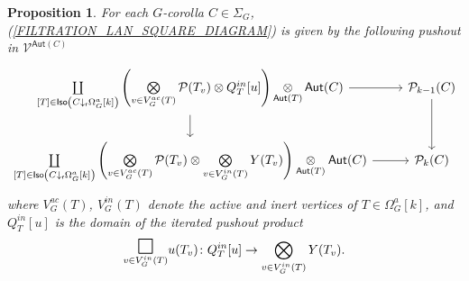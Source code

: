 \documentclass[a4paper,10pt
,draft
]{article}%
\numberwithin{equation}{section}
\numberwithin{figure}{section}
\newtheorem{proposition}[equation]{Proposition}%
\theoremstyle{definition} %
\newcommand{\V}{\ensuremath{\mathcal V}}
\renewcommand{\P}{\ensuremath{\mathcal P}}
\newcommand{\1}{\ensuremath{\mathbbm 1}}%
\begin{document}
\begin{proposition}\label{FILTINTALT PROP}
For each $G$-corolla $C \in \Sigma_G$,
(\ref{FILTRATION_LAN_SQUARE_DIAGRAM})
is given by the following pushout in $\V^{\mathsf{Aut}(C)}$
\begin{equation}\label{FILTRATION_LAN_LEVEL}
\begin{tikzcd}
	\coprod\limits_{[T] \in \mathsf{Iso}
		\left(C \downarrow_{\mathsf{r}} \Omega_G^a[k]\right)}
	\left(
		\bigotimes\limits_{v \in V_{G}^{ac}(T)}\P(T_v) \otimes
		Q_T^{in}[u]
	\right)
		\mathop{\otimes}\limits_{\mathsf{Aut}(T)} \mathsf{Aut}(C)
	\arrow[r] \arrow[d] &
	\P_{k-1}(C) \arrow[d] 
\\
	\coprod\limits_{[T] \in \mathsf{Iso}
		\left(C \downarrow_{\mathsf{r}} \Omega_G^a[k]\right)}
	\left(
		\bigotimes\limits_{v \in V_{G}^{ac}(T)}\P(T_v) \otimes
		\bigotimes\limits_{v \in V_{G}^{in}(T)} Y(T_v)
	\right)
		\underset{\mathsf{Aut}(T)}{\otimes} \mathsf{Aut}(C)
	\arrow[r] &
	\P_k(C)
\end{tikzcd}
\end{equation}
where $ V_{G}^{ac}(T)$, $V_{G}^{in}(T)$ denote the active and inert vertices of $T \in \Omega_G^a[k]$,
and $Q_T^{in}[u]$ is the domain 
of the iterated pushout product
\[
		\underset{v \in V_G^{in}(T)}
		{\mathlarger{\mathlarger{\mathlarger{\square}}}}u(T_v)
	\colon
		Q_T^{in}[u] \to
		\bigotimes\limits_{v \in V_{G}^{in}(T)} Y(T_v).
\]
\end{proposition}
\end{document}
